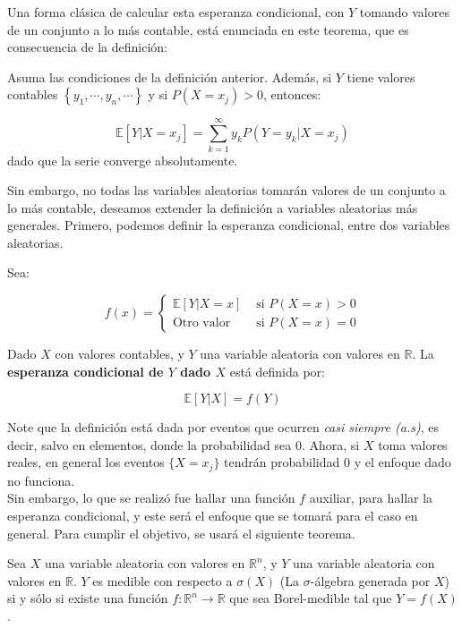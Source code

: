 Una forma clásica de calcular esta esperanza condicional, con $Y$ tomando valores de un conjunto a lo más contable, está enunciada en este teorema, que es consecuencia de la definición:

\begin{theorem}
	Asuma las condiciones de la definición anterior. Además, si $Y$ tiene valores contables $\left\{ y_1, \cdots, y_n, \cdots \right\}$ y si $P(X = x_j) > 0$, entonces:

	\[
		\mathbb{E}[Y \vert X = x_j] = \sum_{k = 1}^{\infty} y_k P(Y = y_k \vert X = x_j)
	\]
	dado que la serie converge absolutamente.
\end{theorem}

Sin embargo, no todas las variables aleatorias tomarán valores de un conjunto a lo más contable, deseamos extender la definición a variables aleatorias más generales. Primero, podemos definir la esperanza condicional, entre dos variables aleatorias. 

\begin{boxDef}
	Sea:

	\[
		f(x) = \left\{  
		\begin{matrix}
			\mathbb{E}[Y \vert X = x] & \text{ si } P(X = x) > 0 \\
			\text{Otro valor} & \text{ si } P(X = x) = 0
		\end{matrix} \right.
	\]

	Dado $X$ con valores contables, y $Y$ una variable aleatoria con valores en $\mathbb{R}$. La \textbf{esperanza condicional de $Y$ dado $X$} está definida por:

	\[
		\mathbb{E}[Y \vert X] = f(Y)
	\]
\end{boxDef}

Note que la definición está dada por eventos que ocurren \textit{casi siempre (a.s)}, es decir, salvo en elementos, donde la probabilidad sea $0$. Ahora, si $X$ toma valores reales, en general los eventos $\{ X = x_j\}$ tendrán probabilidad $0$ y el enfoque dado no funciona. \\

Sin embargo, lo que se realizó fue hallar una función $f$ auxiliar, para hallar la esperanza condicional, y este será el enfoque que se tomará para el caso en general. Para cumplir el objetivo, se usará el siguiente teorema.

\begin{theorem}
	Sea $X$ una variable aleatoria con valores en $\mathbb{R}^n$, y $Y$ una variable aleatoria con valores en $\mathbb{R}$. $Y$ es medible con respecto a $\sigma (X)$ (La $\sigma$-álgebra generada por $X$) si y sólo si existe una función $f: \mathbb{R}^n \rightarrow \mathbb{R}$ que sea Borel-medible tal que $Y = f(X)$.
\end{theorem}

